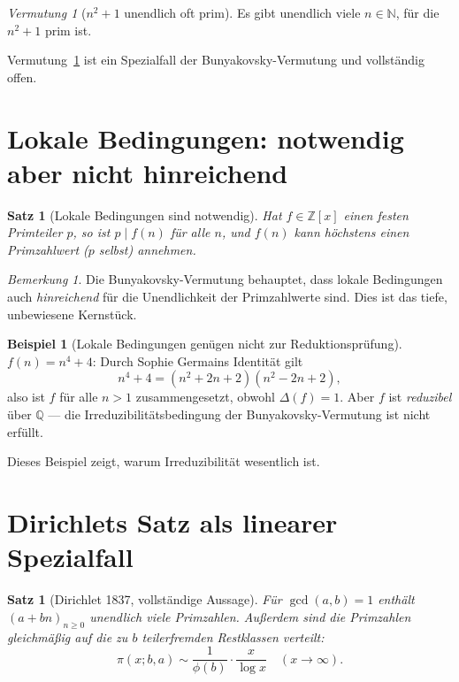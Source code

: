 \documentclass[12pt,a4paper]{amsart}
\newtheorem{satz}[theorem]{Satz}
\theoremstyle{definition}
\newtheorem{example}[theorem]{Beispiel}
\theoremstyle{remark}
\newtheorem{bemerkung}[theorem]{Bemerkung}
\newtheorem{vermutung}[theorem]{Vermutung}
\newcommand{\N}{\mathbb{N}}
\newcommand{\Z}{\mathbb{Z}}
\newcommand{\Q}{\mathbb{Q}}
\begin{document}
\begin{vermutung}[$n^2 + 1$ unendlich oft prim]
\label{verm:nsq}
Es gibt unendlich viele $n \in \N$, für die $n^2 + 1$ prim ist.
\end{vermutung}

Vermutung~\ref{verm:nsq} ist ein Spezialfall der Bunyakovsky-Vermutung
und vollständig offen.

\section{Lokale Bedingungen: notwendig aber nicht hinreichend}

\begin{satz}[Lokale Bedingungen sind notwendig]
Hat $f \in \Z[x]$ einen festen Primteiler $p$, so ist $p \mid f(n)$ für alle
$n$, und $f(n)$ kann höchstens einen Primzahlwert ($p$ selbst) annehmen.
\end{satz}

\begin{bemerkung}
Die Bunyakovsky-Vermutung behauptet, dass lokale Bedingungen auch
\emph{hinreichend} für die Unendlichkeit der Primzahlwerte sind.
Dies ist das tiefe, unbewiesene Kernstück.
\end{bemerkung}

\begin{example}[Lokale Bedingungen genügen nicht zur Reduktionsprüfung]
$f(n) = n^4 + 4$: Durch Sophie Germains Identität gilt
\[
  n^4 + 4 = (n^2 + 2n + 2)(n^2 - 2n + 2),
\]
also ist $f$ für alle $n > 1$ zusammengesetzt, obwohl $\Delta(f) = 1$.
Aber $f$ ist \emph{reduzibel} über $\Q$ --- die Irreduzibilitätsbedingung
der Bunyakovsky-Vermutung ist nicht erfüllt.
\end{example}

Dieses Beispiel zeigt, warum Irreduzibilität wesentlich ist.

\section{Dirichlets Satz als linearer Spezialfall}

\begin{satz}[Dirichlet 1837, vollständige Aussage]
Für $\gcd(a, b) = 1$ enthält $(a + bn)_{n \geq 0}$ unendlich viele Primzahlen.
Außerdem sind die Primzahlen gleichmäßig auf die zu $b$ teilerfremden
Restklassen verteilt:
\[
  \pi(x; b, a) \sim \frac{1}{\phi(b)} \cdot \frac{x}{\log x}
  \quad (x \to \infty).
\]
\end{satz}
\end{document}
